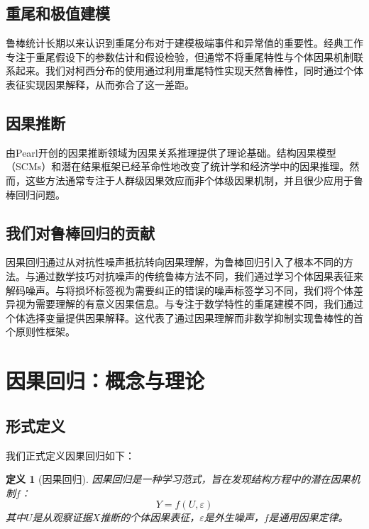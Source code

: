 \documentclass[conference]{IEEEtran}
\newtheorem{definition}{定义}[section]
\begin{document}
\begin{CJK}{UTF8}{gbsn}
\subsection{重尾和极值建模}
鲁棒统计长期以来认识到重尾分布对于建模极端事件和异常值的重要性。经典工作专注于重尾假设下的参数估计和假设检验，但通常不将重尾特性与个体因果机制联系起来。我们对柯西分布的使用通过利用重尾特性实现天然鲁棒性，同时通过个体表征实现因果解释，从而弥合了这一差距。

\subsection{因果推断}
由Pearl\cite{pearl2009causality}开创的因果推断领域为因果关系推理提供了理论基础。结构因果模型（SCMs）\cite{spirtes2000causation}和潜在结果框架\cite{imbens2015causal}已经革命性地改变了统计学和经济学中的因果推理。然而，这些方法通常专注于人群级因果效应而非个体级因果机制，并且很少应用于鲁棒回归问题。

\subsection{我们对鲁棒回归的贡献}
因果回归通过从对抗性噪声抵抗转向因果理解，为鲁棒回归引入了根本不同的方法。与通过数学技巧对抗噪声的传统鲁棒方法不同，我们通过学习个体因果表征来解码噪声。与将损坏标签视为需要纠正的错误的噪声标签学习不同，我们将个体差异视为需要理解的有意义因果信息。与专注于数学特性的重尾建模不同，我们通过个体选择变量提供因果解释。这代表了通过因果理解而非数学抑制实现鲁棒性的首个原则性框架。

\section{因果回归：概念与理论}
\label{sec:concept}

\subsection{形式定义}

我们正式定义因果回归如下：

\begin{definition}[因果回归]
因果回归是一种学习范式，旨在发现结构方程中的潜在因果机制$f$：
\begin{equation}
Y = f(U, \varepsilon)
\end{equation}
其中$U$是从观察证据$X$推断的个体因果表征，$\varepsilon$是外生噪声，$f$是通用因果定律。
\end{definition}


\end{CJK}
\end{document}
